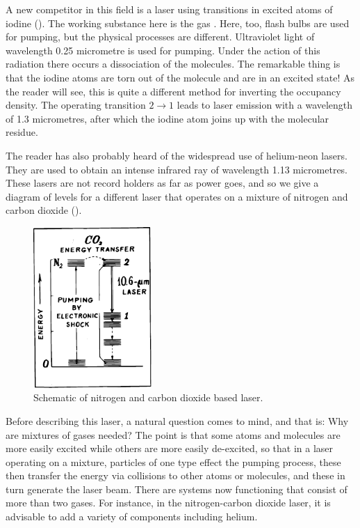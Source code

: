 A new competitor in this field is a laser using transitions in excited atoms of iodine (). The working substance here is the gas . Here, too, flash bulbs are used for pumping, but the physical processes are different. Ultraviolet light of wavelength 0.25 micrometre is used for pumping. Under the action of this radiation there occurs a dissociation of the molecules. The remarkable thing is that the iodine atoms are torn out of the molecule and are in an excited state! As the reader will see, this is quite a different method for inverting the occupancy density. The operating transition $2 \to 1$ leads to laser emission with a wavelength of 1.3 micrometres, after which the iodine atom joins up with the molecular residue.

The reader has also probably heard of the widespread use of helium-neon lasers. They are used to obtain an intense infrared ray of wavelength 1.13 micrometres. These lasers are not record holders as far as power goes, and so we give a diagram of levels for a different laser that operates on a mixture of nitrogen and carbon dioxide ().

\begin{figure}[!ht]
\centering
\includegraphics[width=0.4\textwidth]{figures/fig-01-08.pdf}
\caption{Schematic of nitrogen and carbon dioxide based laser.}
\label{fig-1.8}
\end{figure}
Before describing this laser, a natural question comes to mind, and that is: Why are mixtures of gases needed? The point is that some atoms and molecules are more easily excited while others are more easily de-excited, so that in a laser operating on a mixture, particles of one type effect the pumping process, these then transfer the energy via collisions to other atoms or molecules, and these in turn generate the laser beam. There are systems now functioning that consist of more than two gases.
For instance, in the nitrogen-carbon dioxide laser, it is advisable to add a variety of components including helium.

